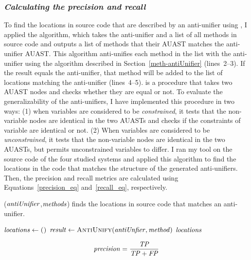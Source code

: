 \subsubsection{\emph{Calculating the precision and recall}}  \label{precision}
To find the locations in source code that are described by an anti-unifier using , I applied the  algorithm, which takes the anti-unifier and a list of all methods in source code and outputs a list of methods that their AUAST matches the anti-unifier AUAST. This algorithm anti-unifies each method in the list with the anti-unifier using the  algorithm described in Section~\ref{meth-antiUnifier} (lines~2--3). If the result equals the anti-unifier, that method will be added to the list of locations matching the anti-unifier (lines~4--5).  is a procedure that takes two AUAST nodes and checks whether they are equal or not. To evaluate the generalizability of the anti-unifiers, I have implemented this procedure in two ways: (1) when variables are considered to be \emph{constrained}, it tests that the non-variable nodes are identical in the two AUASTs and checks if the constraints of variable are identical or not. (2) When variables are considered to be \emph{unconstrained}, it tests that the non-variable nodes are identical in the two AUASTs, but permits unconstrained variables to differ. I ran my tool on the source code of the four studied systems and applied this algorithm to find the locations in the code that matches the structure of the generated anti-unifiers. Then, the precision and recall metrics are calculated using Equations~\ref{precision_eq} and~\ref{recall_eq}, respectively.


\begin{algorithm}
\caption{($\mathit{antiUnifier}$,$\mathit{methods}$) finds the locations in source code that matches an anti-unifier.}
\label{alg-determine}
\begin{algorithmic}[1]
\DetermineLocations
    \State $\mathit{locations} \gets \textsc{()}$
    \State $\mathit{result} \gets  \textsc{AntiUnify}(\mathit{antiUnfier},\mathit{method})$
		\EndIf 		
		\EndFor
 \Return $\mathit{locations} $  	
  \end{algorithmic}
\end{algorithm}

\begin{equation}\label{precision_eq}
\mathit{precision} = \frac{\mathit{TP}}{{\mathit{TP}+\mathit{FP}}}
\end{equation}


